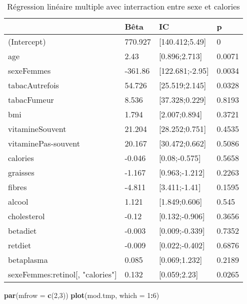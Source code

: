 \documentclass[]{article}
\newenvironment{Shaded}{\begin{snugshade}}{\end{snugshade}}
\newcommand{\KeywordTok}[1]{\textcolor[rgb]{0.13,0.29,0.53}{\textbf{#1}}}
\newcommand{\DataTypeTok}[1]{\textcolor[rgb]{0.13,0.29,0.53}{#1}}
\newcommand{\DecValTok}[1]{\textcolor[rgb]{0.00,0.00,0.81}{#1}}
\newcommand{\OperatorTok}[1]{\textcolor[rgb]{0.81,0.36,0.00}{\textbf{#1}}}
\newcommand{\NormalTok}[1]{#1}
\begin{document}
\begin{table}

\caption{\label{tab:unnamed-chunk-63}Régression linéaire multiple avec interraction entre sexe et calories}
\centering
\begin{tabular}[t]{l|l|l|l}
\hline
  & Bêta & IC & p\\
\hline
\rowcolor[HTML]{BBD2E1}  (Intercept) & 770.927 & [140.412;5.49] & 0\\
\hline
age & 2.43 & [0.896;2.713] & 0.0071\\
\hline
\rowcolor[HTML]{BBD2E1}  sexeFemmes & -361.86 & [122.681;-2.95] & 0.0034\\
\hline
tabacAutrefois & 54.726 & [25.519;2.145] & 0.0328\\
\hline
\rowcolor[HTML]{BBD2E1}  tabacFumeur & 8.536 & [37.328;0.229] & 0.8193\\
\hline
bmi & 1.794 & [2.007;0.894] & 0.3721\\
\hline
\rowcolor[HTML]{BBD2E1}  vitamineSouvent & 21.204 & [28.252;0.751] & 0.4535\\
\hline
vitaminePas-souvent & 20.167 & [30.472;0.662] & 0.5086\\
\hline
\rowcolor[HTML]{BBD2E1}  calories & -0.046 & [0.08;-0.575] & 0.5658\\
\hline
graisses & -1.167 & [0.963;-1.212] & 0.2263\\
\hline
\rowcolor[HTML]{BBD2E1}  fibres & -4.811 & [3.411;-1.41] & 0.1595\\
\hline
alcool & 1.121 & [1.849;0.606] & 0.545\\
\hline
\rowcolor[HTML]{BBD2E1}  cholesterol & -0.12 & [0.132;-0.906] & 0.3656\\
\hline
betadiet & -0.003 & [0.009;-0.339] & 0.7352\\
\hline
\rowcolor[HTML]{BBD2E1}  retdiet & -0.009 & [0.022;-0.402] & 0.6876\\
\hline
betaplasma & 0.085 & [0.069;1.232] & 0.2189\\
\hline
\rowcolor[HTML]{BBD2E1}  sexeFemmes:retinol[, "calories"] & 0.132 & [0.059;2.23] & 0.0265\\
\hline
\end{tabular}
\end{table}

\begin{Shaded}
\begin{Highlighting}[]
\KeywordTok{par}\NormalTok{(}\DataTypeTok{mfrow =} \KeywordTok{c}\NormalTok{(}\DecValTok{2}\NormalTok{,}\DecValTok{3}\NormalTok{))}
\KeywordTok{plot}\NormalTok{(mod.tmp, }\DataTypeTok{which =} \DecValTok{1}\OperatorTok{:}\DecValTok{6}\NormalTok{)}
\end{Highlighting}
\end{Shaded}
\end{document}
